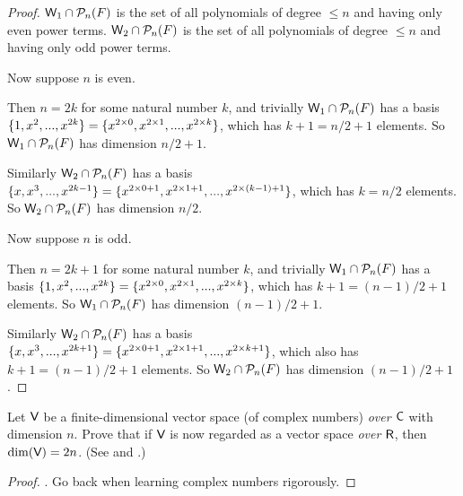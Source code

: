 \begin{proof}
\(\textsf{W}_1 \cap \mathcal{P}_n(F)\) is the set of all polynomials of degree \(\le n\) and having only even power terms.
\(\textsf{W}_2 \cap \mathcal{P}_n(F)\) is the set of all polynomials of degree \(\le n\) and having only odd power terms.

Now suppose \(n\) is even.

Then \(n = 2k\) for some natural number \(k\), and trivially \(\textsf{W}_1 \cap \mathcal{P}_n(F)\) has a basis \(\{ 1, x^2, ..., x^{2k} \} = \{ x^{2 \times 0}, x^{2 \times 1}, ..., x^{2 \times k} \}\), which has \(k + 1 = n/2 + 1\) elements.
So \(\textsf{W}_1 \cap \mathcal{P}_n(F)\) has dimension \(n/2 + 1\).

Similarly \(\textsf{W}_2 \cap \mathcal{P}_n(F)\) has a basis \(\{ x, x^3, ..., x^{2k - 1} \} = \{ x^{2 \times 0 + 1}, x^{2 \times 1 + 1}, ..., x^{2 \times (k - 1) + 1} \}\), which has \(k = n/2\) elements.
So \(\textsf{W}_2 \cap \mathcal{P}_n(F)\) has dimension \(n/2\).

Now suppose \(n\) is odd.

Then \(n = 2k + 1\) for some natural number \(k\), and trivially \(\textsf{W}_1 \cap \mathcal{P}_n(F)\) has a basis \(\{ 1, x^2, ..., x^{2k} \} = \{ x^{2 \times 0}, x^{2 \times 1}, ..., x^{2 \times k} \}\), which has \(k + 1 = (n - 1)/2 + 1\) elements.
So \(\textsf{W}_1 \cap \mathcal{P}_n(F)\) has dimension \((n - 1)/2 + 1\).

Similarly \(\textsf{W}_2 \cap \mathcal{P}_n(F)\) has a basis \(\{ x , x^3, ..., x^{2k + 1} \} = \{ x^{2 \times 0 + 1}, x^{2 \times 1 + 1}, ..., x^{2 \times k + 1} \}\), which also has \(k + 1 = (n - 1)/2 + 1\) elements.
So \(\textsf{W}_2 \cap \mathcal{P}_n(F)\) has dimension \((n - 1)/2 + 1\).
\end{proof}

\begin{exercise} \label{exercise 1.6.28}
Let \(\textsf{V}\) be a finite-dimensional vector space (of complex numbers) \emph{over \(\textsf{C}\)} with dimension \(n\).
Prove that if \(\textsf{V}\) is now regarded as a vector space \emph{over \(\textsf{R}\)}, then \(\dim(\textsf{V}) = 2n\).
(See  and .)
\end{exercise}

\begin{proof}
\TODOREF {}.
Go back when learning complex numbers rigorously.
\end{proof}

